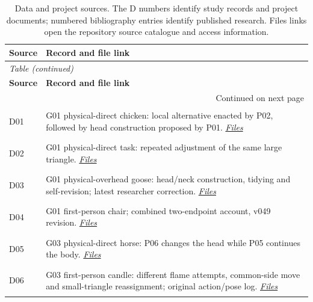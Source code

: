 \begingroup
{}
\fontsize{10}{12.3}\selectfont
\setlength{\tabcolsep}{3pt}
\renewcommand{\arraystretch}{1.16}
\begin{longtable}{@{}p{14mm}>{\raggedright\arraybackslash}p{140mm}@{}}
\caption[Data and project sources.]{Data and project sources. The D numbers identify study records and project documents; numbered bibliography entries identify published research. Files links open the repository source catalogue and access information.}\label{tab:A-2}\\
\toprule
\textbf{Source} & \textbf{Record and file link}\\
\midrule
\endfirsthead
\multicolumn{2}{l}{\small\itshape Table \thetable{} (continued)}\\
\toprule
\textbf{Source} & \textbf{Record and file link}\\
\midrule
\endhead
\midrule
\multicolumn{2}{r}{\small Continued on next page}\\
\endfoot
\bottomrule
\endlastfoot
\hypertarget{src:D01}{}\label{src:D01}D01 & G01 physical-direct chicken: local alternative enacted by P02, followed by head construction proposed by P01. \href{https://github.com/YiyangQin-UQ/REIT7841/blob/main/thesis/v1.1/materials/README.md\#d01}{\textit{Files}} \\
\hypertarget{src:D02}{}\label{src:D02}D02 & G01 physical-direct task: repeated adjustment of the same large triangle. \href{https://github.com/YiyangQin-UQ/REIT7841/blob/main/thesis/v1.1/materials/README.md\#d02}{\textit{Files}} \\
\hypertarget{src:D03}{}\label{src:D03}D03 & G01 physical-overhead goose: head/neck construction, tidying and self-revision; latest researcher correction. \href{https://github.com/YiyangQin-UQ/REIT7841/blob/main/thesis/v1.1/materials/README.md\#d03}{\textit{Files}} \\
\hypertarget{src:D04}{}\label{src:D04}D04 & G01 first-person chair; combined two-endpoint account, v049 revision. \href{https://github.com/YiyangQin-UQ/REIT7841/blob/main/thesis/v1.1/materials/README.md\#d04}{\textit{Files}} \\
\hypertarget{src:D05}{}\label{src:D05}D05 & G03 physical-direct horse: P06 changes the head while P05 continues the body. \href{https://github.com/YiyangQin-UQ/REIT7841/blob/main/thesis/v1.1/materials/README.md\#d05}{\textit{Files}} \\
\hypertarget{src:D06}{}\label{src:D06}D06 & G03 first-person candle: different flame attempts, common-side move and small-triangle reassignment; original action/pose log. \href{https://github.com/YiyangQin-UQ/REIT7841/blob/main/thesis/v1.1/materials/README.md\#d06}{\textit{Files}} \\

\end{longtable}
